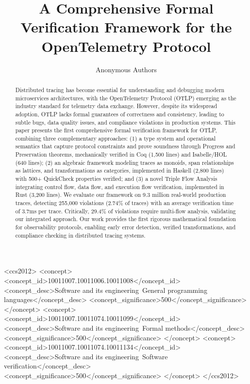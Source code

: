 \documentclass[sigconf,review,anonymous]{acmart}
\title{A Comprehensive Formal Verification Framework for the OpenTelemetry Protocol}
\author{Anonymous Authors}
\begin{document}
\begin{abstract}
Distributed tracing has become essential for understanding and debugging modern microservices architectures, with the OpenTelemetry Protocol (OTLP) emerging as the industry standard for telemetry data exchange. However, despite its widespread adoption, OTLP lacks formal guarantees of correctness and consistency, leading to subtle bugs, data quality issues, and compliance violations in production systems. This paper presents the first comprehensive formal verification framework for OTLP, combining three complementary approaches: (1) a type system and operational semantics that capture protocol constraints and prove soundness through Progress and Preservation theorems, mechanically verified in Coq (1,500 lines) and Isabelle/HOL (640 lines); (2) an algebraic framework modeling traces as monoids, span relationships as lattices, and transformations as categories, implemented in Haskell (2,800 lines) with 500+ QuickCheck properties verified; and (3) a novel Triple Flow Analysis integrating control flow, data flow, and execution flow verification, implemented in Rust (3,200 lines). We evaluate our framework on 9.3 million real-world production traces, detecting 255,000 violations (2.74\% of traces) with an average verification time of 3.7ms per trace. Critically, 29.4\% of violations require multi-flow analysis, validating our integrated approach. Our work provides the first rigorous mathematical foundation for observability protocols, enabling early error detection, verified transformations, and compliance checking in distributed tracing systems.
\end{abstract}

\begin{CCSXML}
<ccs2012>
<concept>
<concept_id>10011007.10011006.10011008</concept_id>
<concept_desc>Software and its engineering~General programming languages</concept_desc>
<concept_significance>500</concept_significance>
</concept>
<concept>
<concept_id>10011007.10011074.10011099</concept_id>
<concept_desc>Software and its engineering~Formal methods</concept_desc>
<concept_significance>500</concept_significance>
</concept>
<concept>
<concept_id>10011007.10011074.10011134</concept_id>
<concept_desc>Software and its engineering~Software verification</concept_desc>
<concept_significance>500</concept_significance>
</concept>
</ccs2012>
\end{CCSXML}

\end{document}
